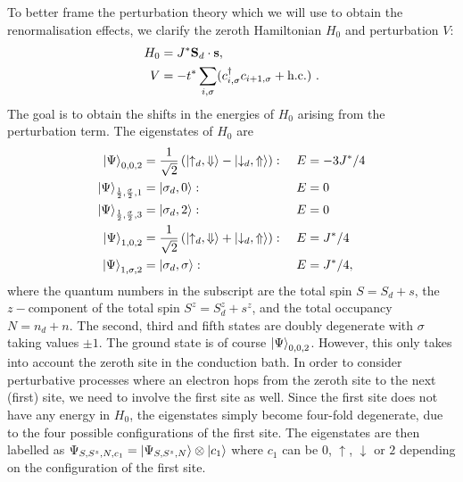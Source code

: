To better frame the perturbation theory which we will use to obtain the renormalisation effects, we clarify the zeroth Hamiltonian \(H_0\) and perturbation \(V\):
\begin{equation}\begin{aligned}
	H_0 &= J^* {\bf S}_d \cdot {\bf s},\\
	V &= -t^* \sum_{i,\sigma}(c^\dagger_{i,\sigma}c_{i+1,\sigma} + \text{h.c.})~.
\end{aligned}\end{equation}
The goal is to obtain the shifts in the energies of \(H_0\) arising from the perturbation term. The eigenstates of \(H_0\) are
\begin{equation}\begin{aligned}
	\ket{\Psi}_{0,0,2} &= \frac{1}{\sqrt 2}\left(\ket{\uparrow_d, \Downarrow} - \ket{\downarrow_d, \Uparrow}\right):~ &&E = -3J^*/4\\
	\ket{\Psi}_{\frac{1}{2}, \frac{\sigma}{2}, 1} &= \ket{\sigma_d, 0}:~ &&E = 0\\
	\ket{\Psi}_{\frac{1}{2}, \frac{\sigma}{2}, 3} &= \ket{\sigma_d, 2}:~ &&E = 0\\
	\ket{\Psi}_{1,0,2} &= \frac{1}{\sqrt 2}\left(\ket{\uparrow_d, \Downarrow} + \ket{\downarrow_d, \Uparrow}\right):~ &&E = J^*/4\\
	\ket{\Psi}_{1,\sigma,2} &= \ket{\sigma_d, \sigma}:~ &&E = J^*/4,
\end{aligned}\end{equation}
where the quantum numbers in the subscript are the total spin \(S = S_d + s\), the \(z-\)component of the total spin \(S^z = S_d^z + s^z\), and the total occupancy \(N = n_d + n\). The second, third and fifth states are doubly degenerate with \(\sigma\) taking values \(\pm 1\). The ground state is of course \(\ket{\Psi}_{0,0,2}\). However, this only takes into account the zeroth site in the conduction bath. In order to consider perturbative processes where an electron hops from the zeroth site to the next (first) site, we need to involve the first site as well. Since the first site does not have any energy in \(H_0\), the eigenstates simply become four-fold degenerate, due to the four possible configurations of the first site. The eigenstates are then labelled as \(\Psi_{S,S^z,N,c_1} = \ket{\Psi_{S,S^z,N}}\otimes\ket{c_1}\) where \(c_1\) can be \(0\), \(\uparrow\), \(\downarrow\) or \(2\) depending on the configuration of the first site.

